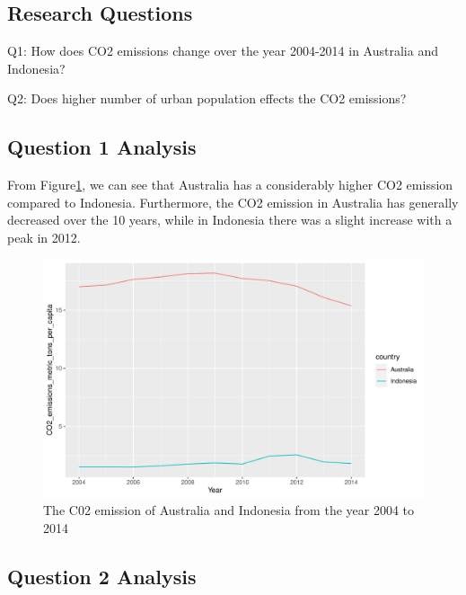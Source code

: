 \documentclass[11pt,a4paper,]{article}
\begin{document}
\clearpage

\hypertarget{research-questions-2}{%
\subsection{Research Questions}\label{research-questions-2}}

Q1: How does CO2 emissions change over the year 2004-2014 in Australia and Indonesia?

Q2: Does higher number of urban population effects the CO2 emissions?

\hypertarget{question-1-analysis-3}{%
\subsection{Question 1 Analysis}\label{question-1-analysis-3}}

From Figure\ref{fig:co2plot}, we can see that Australia has a considerably higher CO2 emission compared to Indonesia. Furthermore, the CO2 emission in Australia has generally decreased over the 10 years, while in Indonesia there was a slight increase with a peak in 2012.

\begin{figure}
\centering
\includegraphics{report_files/figure-latex/co2plot-1.pdf}
\caption{\label{fig:co2plot}The C02 emission of Australia and Indonesia from the year 2004 to 2014}
\end{figure}

\hypertarget{question-2-analysis-3}{%
\subsection{Question 2 Analysis}\label{question-2-analysis-3}}
\end{document}
